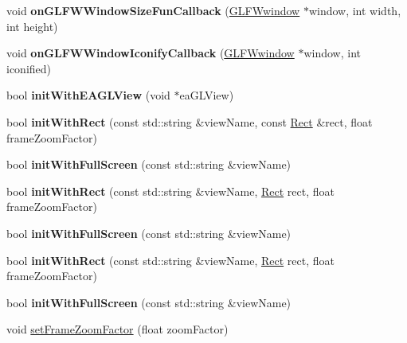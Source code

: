\begin{DoxyCompactItemize}
void {\bfseries on\+G\+L\+F\+W\+Window\+Size\+Fun\+Callback} (\hyperlink{group__window_ga3c96d80d363e67d13a41b5d1821f3242}{G\+L\+F\+Wwindow} $\ast$window, int width, int height)
\item 
\mbox{\label{classGLViewImpl_a502c5bae33a42f3beb8e97547f38dbe0}} 
void {\bfseries on\+G\+L\+F\+W\+Window\+Iconify\+Callback} (\hyperlink{group__window_ga3c96d80d363e67d13a41b5d1821f3242}{G\+L\+F\+Wwindow} $\ast$window, int iconified)
\item 
\mbox{\label{classGLViewImpl_acde8c4c6f7f34228b429639cfe0270b9}} 
bool {\bfseries init\+With\+E\+A\+G\+L\+View} (void $\ast$ea\+G\+L\+View)
\item 
\mbox{\label{classGLViewImpl_ac1cf3cfb00c12fc26f82179325b5613f}} 
bool {\bfseries init\+With\+Rect} (const std\+::string \&view\+Name, const \hyperlink{classRect}{Rect} \&rect, float frame\+Zoom\+Factor)
\item 
\mbox{\label{classGLViewImpl_a2815df489e15eeb1e75d96398ff71c9c}} 
bool {\bfseries init\+With\+Full\+Screen} (const std\+::string \&view\+Name)
\item 
\mbox{\label{classGLViewImpl_ad6cafe42af330824321180c50d5982c1}} 
bool {\bfseries init\+With\+Rect} (const std\+::string \&view\+Name, \hyperlink{classRect}{Rect} rect, float frame\+Zoom\+Factor)
\item 
\mbox{\label{classGLViewImpl_a2815df489e15eeb1e75d96398ff71c9c}} 
bool {\bfseries init\+With\+Full\+Screen} (const std\+::string \&view\+Name)
\item 
\mbox{\label{classGLViewImpl_ad6cafe42af330824321180c50d5982c1}} 
bool {\bfseries init\+With\+Rect} (const std\+::string \&view\+Name, \hyperlink{classRect}{Rect} rect, float frame\+Zoom\+Factor)
\item 
\mbox{\label{classGLViewImpl_a2815df489e15eeb1e75d96398ff71c9c}} 
bool {\bfseries init\+With\+Full\+Screen} (const std\+::string \&view\+Name)
\item 
void \hyperlink{classGLViewImpl_a7db37b677458517eb4a2563bae912d1e}{set\+Frame\+Zoom\+Factor} (float zoom\+Factor)

\end{DoxyCompactItemize}
